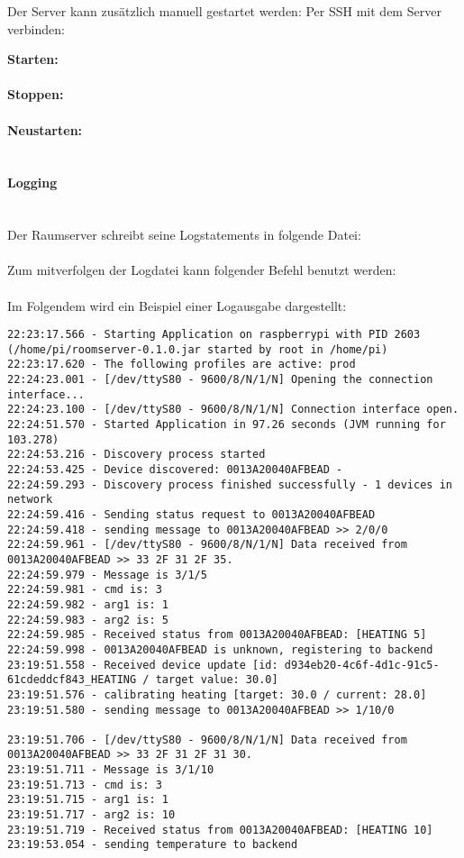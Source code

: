 Der Server kann zusätzlich manuell gestartet werden:
Per SSH mit dem Server verbinden:

\textbf{Starten:}\\
\\

\textbf{Stoppen:}\\
\\

\textbf{Neustarten:}\\
\\

\paragraph{Logging}\label{Logging}\mbox{}\\
Der Raumserver schreibt seine Logstatements in folgende Datei:\\
\\
Zum mitverfolgen der Logdatei kann folgender Befehl benutzt werden:\\
\\
Im Folgendem wird ein Beispiel einer Logausgabe dargestellt:
\vspace{2em}
\begin{lstlisting}
22:23:17.566 - Starting Application on raspberrypi with PID 2603 (/home/pi/roomserver-0.1.0.jar started by root in /home/pi)
22:23:17.620 - The following profiles are active: prod
22:24:23.001 - [/dev/ttyS80 - 9600/8/N/1/N] Opening the connection interface...
22:24:23.100 - [/dev/ttyS80 - 9600/8/N/1/N] Connection interface open.
22:24:51.570 - Started Application in 97.26 seconds (JVM running for 103.278)
22:24:53.216 - Discovery process started
22:24:53.425 - Device discovered: 0013A20040AFBEAD -  
22:24:59.293 - Discovery process finished successfully - 1 devices in network
22:24:59.416 - Sending status request to 0013A20040AFBEAD
22:24:59.418 - sending message to 0013A20040AFBEAD >> 2/0/0
22:24:59.961 - [/dev/ttyS80 - 9600/8/N/1/N] Data received from 0013A20040AFBEAD >> 33 2F 31 2F 35.
22:24:59.979 - Message is 3/1/5
22:24:59.981 - cmd is: 3
22:24:59.982 - arg1 is: 1
22:24:59.983 - arg2 is: 5
22:24:59.985 - Received status from 0013A20040AFBEAD: [HEATING 5]
22:24:59.998 - 0013A20040AFBEAD is unknown, registering to backend
23:19:51.558 - Received device update [id: d934eb20-4c6f-4d1c-91c5-61cdeddcf843_HEATING / target value: 30.0]
23:19:51.576 - calibrating heating [target: 30.0 / current: 28.0]
23:19:51.580 - sending message to 0013A20040AFBEAD >> 1/10/0

23:19:51.706 - [/dev/ttyS80 - 9600/8/N/1/N] Data received from 0013A20040AFBEAD >> 33 2F 31 2F 31 30.
23:19:51.711 - Message is 3/1/10
23:19:51.713 - cmd is: 3
23:19:51.715 - arg1 is: 1
23:19:51.717 - arg2 is: 10
23:19:51.719 - Received status from 0013A20040AFBEAD: [HEATING 10]
23:19:53.054 - sending temperature to backend

\end{lstlisting}
\vspace{2em}

